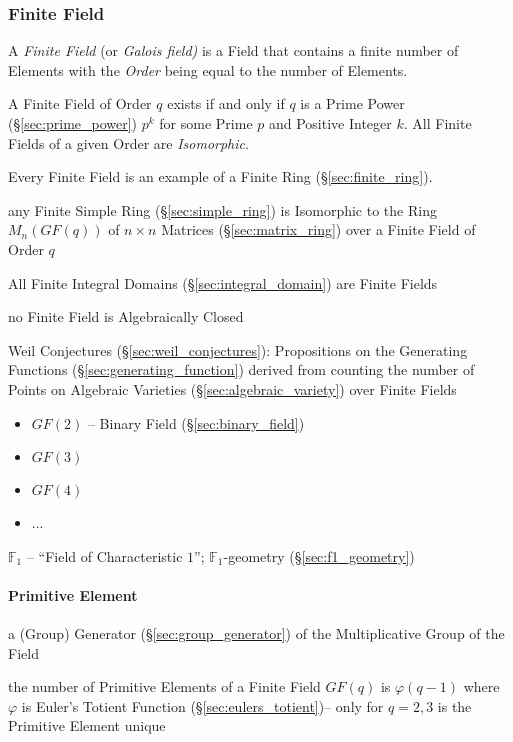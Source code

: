 \subsubsection{Finite Field}\label{sec:finite_field}

A \emph{Finite Field} (or \emph{Galois field)} is a Field that contains a
finite number of Elements with the \emph{Order} being equal to the number of
Elements.

A Finite Field of Order $q$ exists if and only if $q$ is a Prime Power
(\S\ref{sec:prime_power}) $p^k$ for some Prime $p$ and Positive Integer $k$.
All Finite Fields of a given Order are \emph{Isomorphic}.

Every Finite Field is an example of a Finite Ring (\S\ref{sec:finite_ring}).

any Finite Simple Ring (\S\ref{sec:simple_ring}) is Isomorphic to the Ring
$M_n(GF(q))$ of $n \times n$ Matrices (\S\ref{sec:matrix_ring}) over a Finite
Field of Order $q$

All Finite Integral Domains (\S\ref{sec:integral_domain}) are Finite Fields

no Finite Field is Algebraically Closed

Weil Conjectures (\S\ref{sec:weil_conjectures}): Propositions on the Generating
Functions (\S\ref{sec:generating_function}) derived from counting the number of
Points on Algebraic Varieties (\S\ref{sec:algebraic_variety}) over Finite Fields

\begin{itemize}
  \item $GF(2)$ -- Binary Field (\S\ref{sec:binary_field})
  \item $GF(3)$
  \item $GF(4)$
  \item ...
\end{itemize}

\fist $\mathbb{F}_1$ -- ``Field of Characteristic $1$''; $\mathbb{F}_1$-geometry
(\S\ref{sec:f1_geometry})



\paragraph{Primitive Element}\label{sec:primitive_element}\hfill

a (Group) Generator (\S\ref{sec:group_generator}) of the Multiplicative Group of
the Field

the number of Primitive Elements of a Finite Field $GF(q)$ is $\varphi(q - 1)$
where $\varphi$ is Euler's Totient Function (\S\ref{sec:eulers_totient})-- only
for $q=2,3$ is the Primitive Element unique

